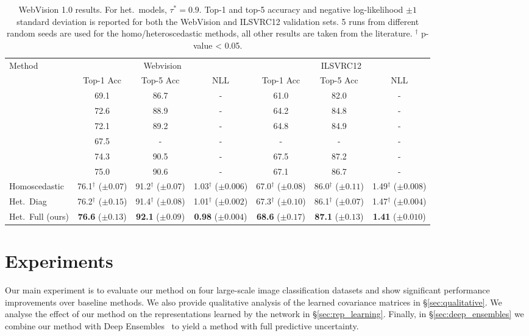 \documentclass[final]{cvpr}
\begin{document}
\begin{table*}[tbh]
\centering
\begin{tabular}{lcccccc}
\toprule
Method &
  \multicolumn{3}{c}{Webvision} &
  \multicolumn{3}{c}{ILSVRC12} \\
 & Top-1 Acc & Top-5 Acc & NLL & Top-1 Acc & Top-5 Acc & NLL \\
\midrule
\citet{lee2018cleannet} & 69.1 & 86.7 & - & 61.0 & 82.0 & - \\
\citet{MentorNet.2018} & 72.6 & 88.9 & - & 64.2 & 84.8 & - \\
\citet{guo2018curriculumnet} & 72.1 & 89.2 & - & 64.8 & 84.9 & - \\
\citet{saxena2019data} & 67.5 & - & - & - & - & - \\
\citet{jiang2020beyond} & 74.3 & 90.5 & - & 67.5 & 87.2 & - \\
\citet{cao2020heteroskedastic} & 75.0 & 90.6 & - & 67.1 & 86.7 & - \\
\midrule
Homoscedastic & 76.1$^\dagger$ ($\pm 0.07$) & 91.2$^\dagger$ ($\pm 0.07$) & 1.03$^\dagger$ ($\pm 0.006$) & 67.0$^\dagger$ ($\pm 0.08$) & 86.0$^\dagger$ ($\pm 0.11$) & 1.49$^\dagger$ ($\pm 0.008$) \\
Het.\ Diag~\cite{collier2020analysis} & 76.2$^\dagger$ ($\pm 0.15$) & 91.4$^\dagger$ ($\pm 0.08$) & 1.01$^\dagger$ ($\pm 0.002$) & 67.3$^\dagger$ ($\pm 0.10$) & 86.1$^\dagger$ ($\pm 0.07$) & 1.47$^\dagger$ ($\pm 0.004$)\\ 
Het.\ Full (ours) & \textbf{76.6} ($\pm 0.13$) & \textbf{92.1} ($\pm 0.09$) & \textbf{0.98} ($\pm 0.004$) & \textbf{68.6} ($\pm 0.17$) & \textbf{87.1} ($\pm 0.13$) & \textbf{1.41} ($\pm 0.010$)\\ 
\bottomrule
\end{tabular}
\caption{WebVision 1.0 results. For het.\ models, $\tau^\ast = 0.9$. Top-1 and top-5 accuracy and negative log-likelihood $\pm 1$ standard deviation is reported for both the WebVision and ILSVRC12 validation sets. 5 runs from different random seeds are used for the homo/heteroscedastic methods, all other results are taken from the literature. $^\dagger$ p-value < 0.05.}
\label{table:webvision}
\end{table*}

\section{Experiments}

Our main experiment is to evaluate our method on four large-scale image classification datasets and show significant performance improvements over baseline methods. We also provide qualitative analysis of the learned covariance matrices in \S \ref{sec:qualitative}. We analyse the effect of our method on the representations learned by the network in \S \ref{sec:rep_learning}. Finally, in \S \ref{sec:deep_ensembles} we combine our method with Deep Ensembles~\cite{lakshminarayanan2017simple} to yield a method with full predictive uncertainty.
\end{document}
